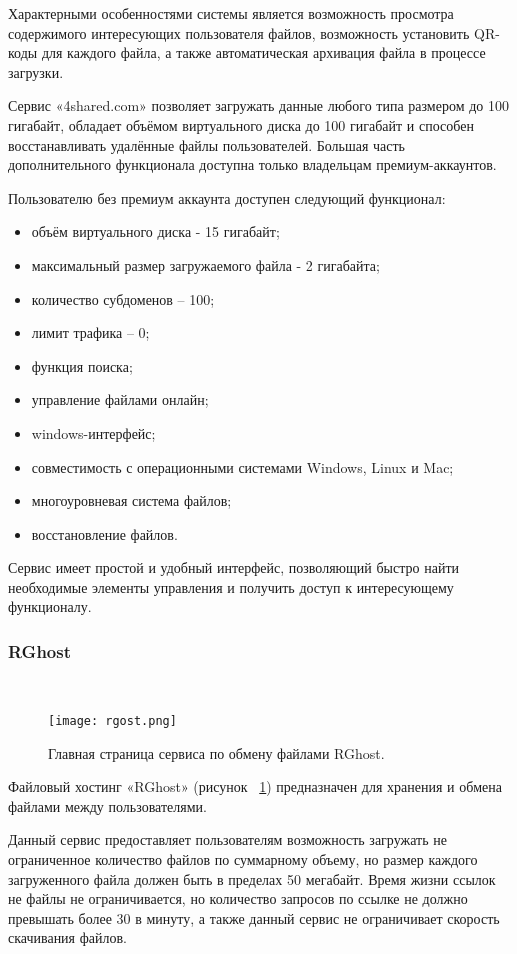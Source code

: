 Характерными особенностями системы является возможность просмотра содержимого интересующих пользователя файлов, возможность установить QR-коды для каждого файла, а также автоматическая архивация файла в процессе загрузки.

Сервис «4shared.com» позволяет загружать данные любого типа размером до 100 гигабайт, обладает объёмом виртуального диска до 100 гигабайт и способен восстанавливать удалённые файлы пользователей. Большая часть дополнительного функционала доступна только владельцам премиум-аккаунтов. 

Пользователю без премиум аккаунта доступен следующий функционал:
\begin{itemize}
  \item объём виртуального диска - 15 гигабайт;
  \item максимальный размер загружаемого файла - 2 гигабайта;
  \item количество субдоменов – 100;
  \item лимит трафика – 0;
  \item функция поиска;
  \item управление файлами онлайн;
  \item windows-интерфейс;
  \item совместимость с операционными системами Windows, Linux и Mac;
  \item многоуровневая система файлов;
  \item восстановление файлов.
\end{itemize}

Сервис имеет простой и удобный интерфейс, позволяющий быстро найти необходимые элементы управления и получить доступ к интересующему функционалу.  

\subsubsection{RGhost}~\\
\label{ssub:practice:itechart_characteristic:rghost}

\begin{figure}[ht]
  \centering
  \texttt{[image: rgost.png]}  
    \caption{ Главная страница сервиса по обмену файлами RGhost. }
    \label{fig:rghost}
\end{figure}

Файловый хостинг «RGhost» (рисунок ~\ref{fig:rghost}) предназначен для хранения и обмена файлами между пользователями.

Данный сервис предоставляет пользователям возможность загружать не ограниченное количество файлов по суммарному объему, но размер каждого загруженного файла должен быть в пределах 50 мегабайт. Время жизни ссылок не файлы не ограничивается, но количество запросов по ссылке не должно превышать более 30 в минуту, а также данный сервис не ограничивает скорость скачивания файлов. 

